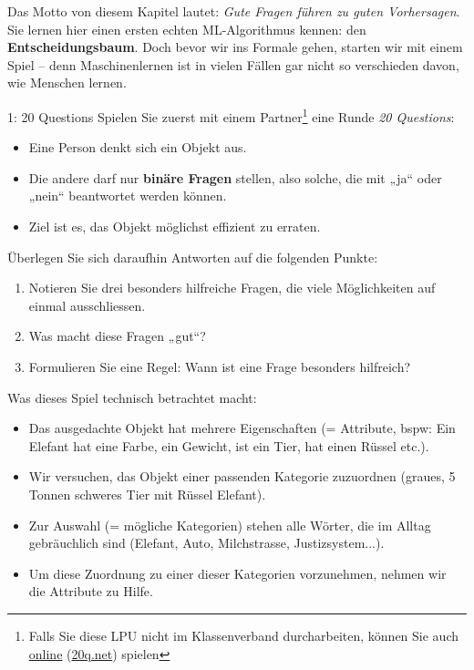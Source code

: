 \begin{lpu}

Das Motto von diesem Kapitel lautet: \textit{Gute Fragen führen zu guten Vorhersagen}. Sie lernen hier einen ersten echten ML-Algorithmus kennen: den \textbf{Entscheidungsbaum}. Doch bevor wir ins Formale gehen, starten wir mit einem Spiel – denn Maschinenlernen ist in vielen Fällen gar nicht so verschieden davon, wie Menschen lernen.

\begin{aufgabe}{1: 20 Questions}
Spielen Sie zuerst mit einem Partner\footnote{Falls Sie diese LPU nicht im Klassenverband durcharbeiten, können Sie auch \href{http://www.20q.net/}{online} (\href{http://www.20q.net/}{\url{20q.net}}) spielen} eine Runde \emph{20 Questions}:
\begin{itemize}
  \item Eine Person denkt sich ein Objekt aus.
  \item Die andere darf nur \textbf{binäre Fragen} stellen, also solche, die mit „ja“ oder „nein“ beantwortet werden können.
  \item Ziel ist es, das Objekt möglichst effizient zu erraten.
\end{itemize}

Überlegen Sie sich daraufhin Antworten auf die folgenden Punkte:
\begin{enumerate}
  \item Notieren Sie drei besonders hilfreiche Fragen, die viele Möglichkeiten auf einmal ausschliessen.
  \item Was macht diese Fragen „gut“?
  \item Formulieren Sie eine Regel: Wann ist eine Frage besonders hilfreich?
\end{enumerate}
\end{aufgabe}

Was dieses Spiel technisch betrachtet macht: 
\begin{itemize}
    \item Das ausgedachte Objekt hat mehrere Eigenschaften (= Attribute, bspw: Ein Elefant hat eine Farbe, ein Gewicht, ist ein Tier, hat einen Rüssel etc.).
    \item Wir versuchen, das Objekt einer passenden Kategorie zuzuordnen (graues, 5 Tonnen schweres Tier mit Rüssel \Rightarrow Elefant).
    \item Zur Auswahl (= mögliche Kategorien) stehen alle Wörter, die im Alltag gebräuchlich sind (Elefant, Auto, Milchstrasse, Justizsystem...).
    \item Um diese Zuordnung zu einer dieser Kategorien vorzunehmen, nehmen wir die Attribute zu Hilfe.
\end{itemize}


\end{lpu}
